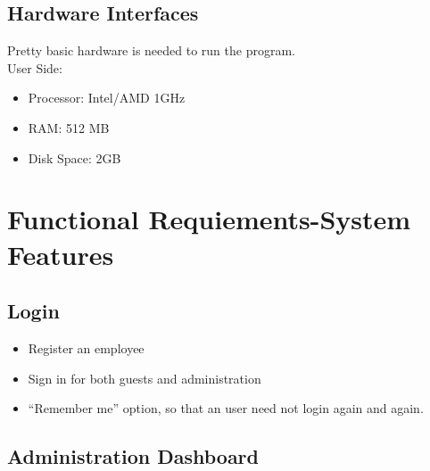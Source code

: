 \documentclass{scrreprt}
\begin{document}
\section{Hardware Interfaces}

Pretty basic hardware is needed to run the program.\\
User Side:
\begin{itemize}
\item Processor: Intel/AMD 1GHz
\item RAM: 512 MB
\item Disk Space: 2GB
\end{itemize}


\chapter{Functional Requiements-System Features}


\section{Login}
\begin{itemize}
\item Register an employee
\item Sign in for both guests and administration
\item “Remember me” option, so that an user need not login again and again.
\end{itemize}


\section{Administration Dashboard}
\end{document}
